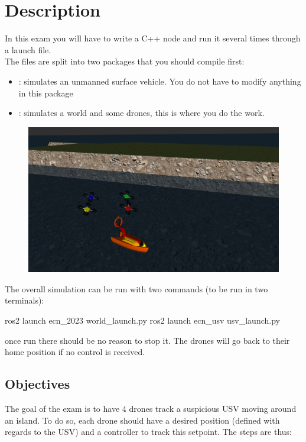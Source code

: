 \documentclass{ecnreport}
\begin{document}



\section{Description}

In this exam you will have to write a C++ node and run it several times through a launch file.\\

The files are split into two packages that you should compile first:

\begin{itemize}
 \item {}: simulates an unmanned surface vehicle. You do not have to modify anything in this package
 \item {}: simulates a world and some drones, this is where you do the work.
\end{itemize}

\begin{figure}[h]\centering
 \includegraphics[width=.5\linewidth]{simulation}
\end{figure}

The overall simulation can be run with two commands (to be run in two terminals):
\begin{bashcodelarge}
 ros2 launch ecn_2023 world_launch.py
 ros2 launch ecn_usv usv_launch.py
\end{bashcodelarge}once run there should be no reason to stop it. The drones will go back to their home position if no control is received.


\subsection*{Objectives}

The goal of the exam is to have 4 drones track a suspicious USV moving around an island. To do so, each drone should have a desired position (defined with regards to the USV) and a controller to track this setpoint. The steps are thus:
\end{document}
